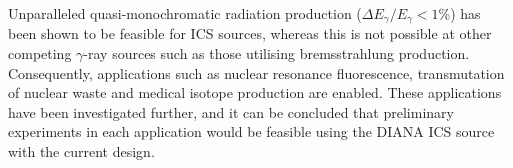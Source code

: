 \documentclass[../main.tex]{subfiles}
\begin{document}
Unparalleled quasi-monochromatic radiation production ($\Delta E_{\gamma}/E_{\gamma} < 1$\%) has been shown to be feasible for ICS sources, whereas this is not possible at other competing $\gamma$-ray sources such as those utilising bremsstrahlung production. Consequently, applications such as nuclear resonance fluorescence, transmutation of nuclear waste and medical isotope production are enabled. These applications have been investigated further, and it can be concluded that preliminary experiments in each application would be feasible using the DIANA ICS source with the current design.
\end{document}
